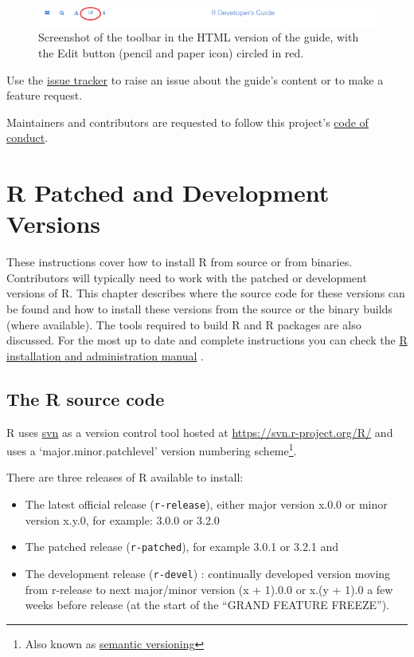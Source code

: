\documentclass[
]{book}
\begin{document}
\begin{figure}
\centering
\includegraphics{img/edit_icon.png}
\caption{Screenshot of the toolbar in the HTML version of the guide, with the Edit button (pencil and paper icon) circled in red.}
\end{figure}

Use the \href{https://github.com/r-devel/rdevguide/issues}{issue tracker} to raise an issue about the guide's content or to make a feature request.

Maintainers and contributors are requested to follow this project's \href{https://github.com/r-devel/rdevguide/blob/main/CONDUCT.md}{code of conduct}.

\hypertarget{GetStart}{%
\chapter{R Patched and Development Versions}\label{GetStart}}

These instructions cover how to install R from source or from binaries.
Contributors will typically need to work with the patched or development versions of R.
This chapter describes where the source code for these versions can be found and how to install these versions from the source or the binary builds (where available).
The tools required to build R and R packages are also discussed.
For the most up to date and complete instructions you can check the \href{https://cran.r-project.org/doc/manuals/r-devel/R-admin.html}{R installation and administration manual} .

\hypertarget{the-r-source-code}{%
\section{The R source code}\label{the-r-source-code}}

R uses \href{https://subversion.apache.org/}{svn} as a version control tool hosted at \url{https://svn.r-project.org/R/} and uses a `major.minor.patchlevel' version numbering scheme\footnote{Also known as \href{https://en.wikipedia.org/wiki/Software_versioning\#Semantic_versioning}{semantic versioning}}.

There are three releases of R available to install:

\begin{itemize}
\item
  The latest official release (\texttt{r-release}), either major version x.0.0 or minor version x.y.0, for example: 3.0.0 or 3.2.0
\item
  The patched release (\texttt{r-patched}), for example 3.0.1 or 3.2.1 and
\item
  The development release (\texttt{r-devel}) : continually developed version moving from r-release to next major/minor version (x + 1).0.0 or x.(y + 1).0 a few weeks before release (at the start of the ``GRAND FEATURE FREEZE'').
\end{itemize}
\end{document}
